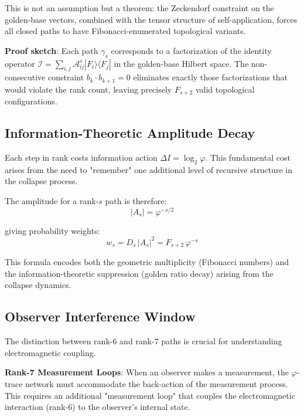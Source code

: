 \documentclass[%
 reprint,
 amsmath,amssymb,
 aps,
 prd,
 nofootinbib,      %
 longbibliography  %
]{revtex4-2}
\begin{document}
This is not an assumption but a theorem: the Zeckendorf constraint on the golden-base vectors, combined with the tensor structure of self-application, forces all closed paths to have Fibonacci-enumerated topological variants.

\textbf{Proof sketch}: Each path $\gamma_s$ corresponds to a factorization of the identity operator $\mathcal{I} = \sum_{i,j} \mathcal{A}_{ij}^s |F_i\rangle\langle F_j|$ in the golden-base Hilbert space. The non-consecutive constraint $b_k \cdot b_{k+1} = 0$ eliminates exactly those factorizations that would violate the rank count, leaving precisely $F_{s+2}$ valid topological configurations.

\subsection{Information-Theoretic Amplitude Decay}

Each step in rank costs information action $\Delta I = \log_2\varphi$. This fundamental cost arises from the need to "remember" one additional level of recursive structure in the collapse process.

The amplitude for a rank-$s$ path is therefore:
\begin{equation}
|A_s| = \varphi^{-s/2}
\end{equation}

giving probability weights:
\begin{equation}
  w_s = D_s\,|A_s|^2 = F_{s+2}\,\varphi^{-s}
  \label{eq:weight-basic}
\end{equation}

This formula encodes both the geometric multiplicity (Fibonacci numbers) and the information-theoretic suppression (golden ratio decay) arising from the collapse dynamics.

\subsection{Observer Interference Window}

The distinction between rank-6 and rank-7 paths is crucial for understanding electromagnetic coupling.

\textbf{Rank-7 Measurement Loops}: When an observer makes a measurement, the $\varphi$-trace network must accommodate the back-action of the measurement process. This requires an additional "measurement loop" that couples the electromagnetic interaction (rank-6) to the observer's internal state.
\end{document}
